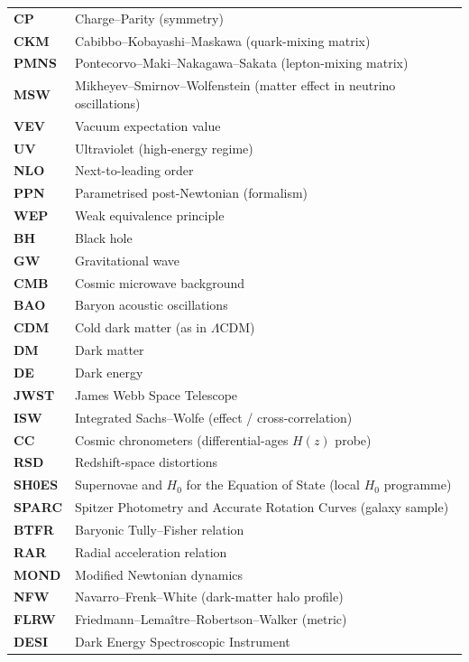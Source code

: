 \documentclass[11pt,a4paper]{article}
\begin{document}
\begin{longtable}{@{}p{2.6cm}p{12.6cm}@{}}
\textbf{CP} & Charge--Parity (symmetry) \\
\textbf{CKM} & Cabibbo--Kobayashi--Maskawa (quark-mixing matrix) \\
\textbf{PMNS} & Pontecorvo--Maki--Nakagawa--Sakata (lepton-mixing matrix) \\
\textbf{MSW} & Mikheyev--Smirnov--Wolfenstein (matter effect in neutrino oscillations) \\
\textbf{VEV} & Vacuum expectation value \\
\textbf{UV} & Ultraviolet (high-energy regime) \\
\textbf{NLO} & Next-to-leading order \\
\textbf{PPN} & Parametrised post-Newtonian (formalism) \\
\textbf{WEP} & Weak equivalence principle \\
\textbf{BH} & Black hole \\
\textbf{GW} & Gravitational wave \\
\textbf{CMB} & Cosmic microwave background \\
\textbf{BAO} & Baryon acoustic oscillations \\
\textbf{CDM} & Cold dark matter (as in $\Lambda$CDM) \\
\textbf{DM} & Dark matter \\
\textbf{DE} & Dark energy \\
\textbf{JWST} & James Webb Space Telescope \\
\textbf{ISW} & Integrated Sachs--Wolfe (effect / cross-correlation) \\
\textbf{CC} & Cosmic chronometers (differential-ages $H(z)$ probe) \\
\textbf{RSD} & Redshift-space distortions \\
\textbf{SH0ES} & Supernovae and $H_0$ for the Equation of State (local $H_0$ programme) \\
\textbf{SPARC} & Spitzer Photometry and Accurate Rotation Curves (galaxy sample) \\
\textbf{BTFR} & Baryonic Tully--Fisher relation \\
\textbf{RAR} & Radial acceleration relation \\
\textbf{MOND} & Modified Newtonian dynamics \\
\textbf{NFW} & Navarro--Frenk--White (dark-matter halo profile) \\
\textbf{FLRW} & Friedmann--Lema\^itre--Robertson--Walker (metric) \\
\textbf{DESI} & Dark Energy Spectroscopic Instrument \\

\end{longtable}
\end{document}
